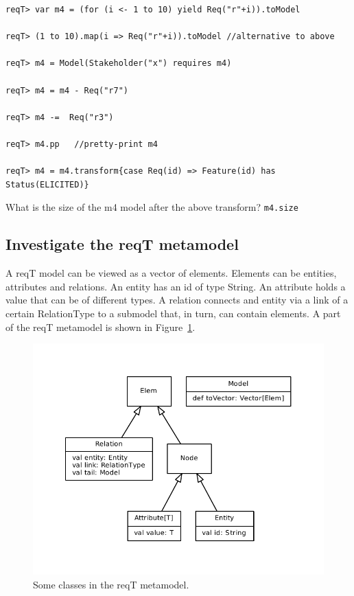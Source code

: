 \documentclass[11pt]{article}
\begin{document}
\begin{framed}
{\scriptsize\begin{verbatim}
reqT> var m4 = (for (i <- 1 to 10) yield Req("r"+i)).toModel

reqT> (1 to 10).map(i => Req("r"+i)).toModel //alternative to above

reqT> m4 = Model(Stakeholder("x") requires m4)

reqT> m4 = m4 - Req("r7")

reqT> m4 -=  Req("r3")

reqT> m4.pp   //pretty-print m4

reqT> m4 = m4.transform{case Req(id) => Feature(id) has Status(ELICITED)}
\end{verbatim}}
\end{framed}
\begin{framed}\noindent
What is the size of the m4 model after the above transform? 
\newline
\verb+m4.size+
\newline
\newline \underline{\hspace{10cm}}
\end{framed}

\subsection{Investigate the reqT metamodel}

A reqT model can be viewed as a vector of elements. Elements can be entities, attributes and relations. An entity has an id of type String. An attribute holds a value that can be of different types. A relation connects and entity via a link of a certain RelationType to a submodel that, in turn, can contain elements. A part of the reqT metamodel is shown in Figure~\ref{fig:metamodel}. 

\begin{figure}[h]
    \centering
    \includegraphics[width=\textwidth]{metamodel-simple.pdf}
    \caption{Some classes in the reqT metamodel.}
    \label{fig:metamodel}
\end{figure}
\end{document}
